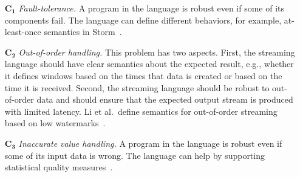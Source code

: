 \begin{itemize}
  \item[$\mathbf{C_1}$] \emph{Fault-tolerance.} A program in the
    language is robust even if some of its components fail. The
    language can define different behaviors, for example,
    at-least-once semantics in Storm~\cite{toshniwal_et_al_2014}.
  \item[$\mathbf{C_2}$] \emph{Out-of-order handling.} This problem has
    two aspects. First, the streaming language should have clear
    semantics about the expected result, e.g., whether it defines
    windows based on the times that data is created or based on the
    time it is received. Second, the streaming language should be
    robust to out-of-order data and should ensure that the expected
    output stream is produced with limited latency. Li et al.\ define
    semantics for out-of-order streaming based on low
    watermarks~\cite{Li:2008:OPN:1453856.1453890}.
  \item[$\mathbf{C_3}$] \emph{Inaccurate value handling.} A program in
    the language is robust even if some of its input data is wrong.
    The language can help by supporting statistical quality
    measures~\cite{wasserkrug_et_al_2008}.
\end{itemize}

